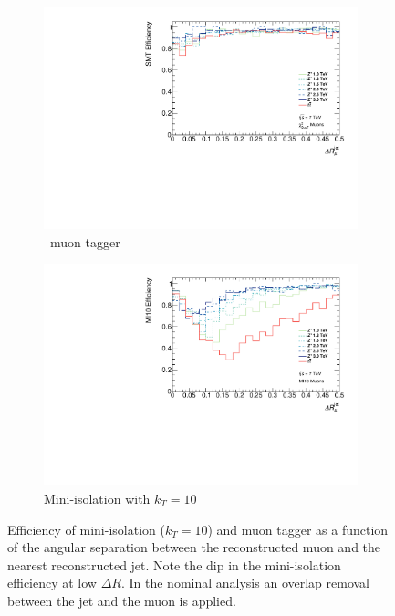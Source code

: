\begin{figure}
\begin{subfigure}{\linewidth} \centering
\includegraphics[width=\textwidth]{PartBoosted/Plots/he_staco_smt_dr.pdf}
\caption{\xsm\ muon tagger} \label{fig:BoostedSMTeffVsDRmuj}
\end{subfigure}

\begin{subfigure}{\linewidth} \centering
\includegraphics[width=\textwidth]{PartBoosted/Plots/he_muid_mi10_dr.pdf}
\caption{Mini-isolation with $k_{T}=10$} \label{fig:BoostedMIeffVsDRmuj}
\end{subfigure}
\caption{Efficiency of mini-isolation ($k_{T}=10$) and \xsm muon tagger as a function of the angular separation between the reconstructed muon and the nearest reconstructed jet. Note the dip in the mini-isolation efficiency at low $\Delta R$. In the nominal analysis an overlap removal between the jet and the muon is applied.} \label{fig:BoostedEfficiencyVsDRmuj}
\end{figure}

